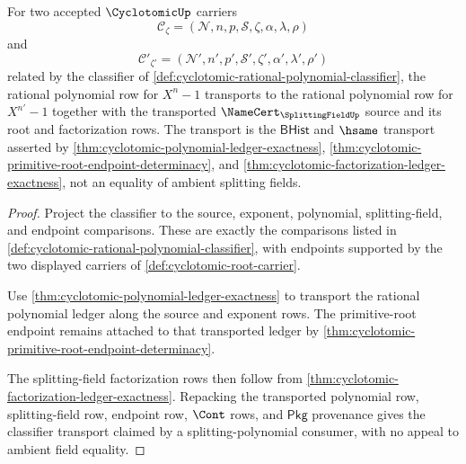 \begin{theorem}
\label{thm:cyclotomic-splitting-polynomial-classifier-transport}
For two accepted $\CyclotomicUp$ carriers
$$
\mathcal{C}_{\zeta}=(\mathcal{N},n,p,\mathcal{S},\zeta,\alpha,\lambda,\rho)
$$
and
$$
\mathcal{C}'_{\zeta'}=(\mathcal{N}',n',p',\mathcal{S}',\zeta',\alpha',\lambda',\rho')
$$
related by the classifier of \autoref{def:cyclotomic-rational-polynomial-classifier}, the rational polynomial row for $X^n-1$ transports to the rational polynomial row for $X^{n'}-1$ together with the transported $\NameCert_{\SplittingFieldUp}$ source and its root and factorization rows. The transport is the $\mathsf{BHist}$ and $\hsame$ transport asserted by \autoref{thm:cyclotomic-polynomial-ledger-exactness}, \autoref{thm:cyclotomic-primitive-root-endpoint-determinacy}, and \autoref{thm:cyclotomic-factorization-ledger-exactness}, not an equality of ambient splitting fields.
\end{theorem}
\begin{proof}
Project the classifier to the source, exponent, polynomial, splitting-field, and endpoint comparisons. These are exactly the comparisons listed in \autoref{def:cyclotomic-rational-polynomial-classifier}, with endpoints supported by the two displayed carriers of \autoref{def:cyclotomic-root-carrier}.

Use \autoref{thm:cyclotomic-polynomial-ledger-exactness} to transport the rational polynomial ledger along the source and exponent rows. The primitive-root endpoint remains attached to that transported ledger by \autoref{thm:cyclotomic-primitive-root-endpoint-determinacy}.

The splitting-field factorization rows then follow from \autoref{thm:cyclotomic-factorization-ledger-exactness}. Repacking the transported polynomial row, splitting-field row, endpoint row, $\Cont$ rows, and $\mathsf{Pkg}$ provenance gives the classifier transport claimed by a splitting-polynomial consumer, with no appeal to ambient field equality.
\end{proof}

